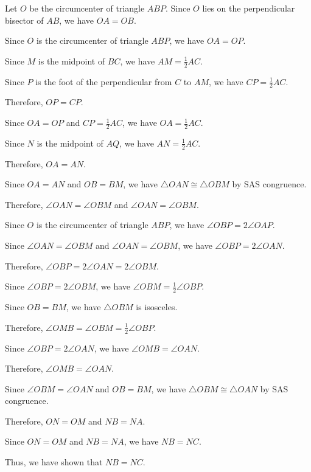 Let $O$ be the circumcenter of triangle $ABP$. Since $O$ lies on the perpendicular bisector of $AB$, we have $OA = OB$. 

Since $O$ is the circumcenter of triangle $ABP$, we have $OA = OP$. 

Since $M$ is the midpoint of $BC$, we have $AM = \frac{1}{2}AC$. 

Since $P$ is the foot of the perpendicular from $C$ to $AM$, we have $CP = \frac{1}{2}AC$. 

Therefore, $OP = CP$. 

Since $OA = OP$ and $CP = \frac{1}{2}AC$, we have $OA = \frac{1}{2}AC$. 

Since $N$ is the midpoint of $AQ$, we have $AN = \frac{1}{2}AC$. 

Therefore, $OA = AN$. 

Since $OA = AN$ and $OB = BM$, we have $\triangle OAN \cong \triangle OBM$ by SAS congruence. 

Therefore, $\angle OAN = \angle OBM$ and $\angle OAN = \angle OBM$. 

Since $O$ is the circumcenter of triangle $ABP$, we have $\angle OBP = 2\angle OAP$. 

Since $\angle OAN = \angle OBM$ and $\angle OAN = \angle OBM$, we have $\angle OBP = 2\angle OAN$. 

Therefore, $\angle OBP = 2\angle OAN = 2\angle OBM$. 

Since $\angle OBP = 2\angle OBM$, we have $\angle OBM = \frac{1}{2}\angle OBP$. 

Since $OB = BM$, we have $\triangle OBM$ is isosceles. 

Therefore, $\angle OMB = \angle OBM = \frac{1}{2}\angle OBP$. 

Since $\angle OBP = 2\angle OAN$, we have $\angle OMB = \angle OAN$. 

Therefore, $\angle OMB = \angle OAN$. 

Since $\angle OBM = \angle OAN$ and $OB = BM$, we have $\triangle OBM \cong \triangle OAN$ by SAS congruence. 

Therefore, $ON = OM$ and $NB = NA$. 

Since $ON = OM$ and $NB = NA$, we have $NB = NC$. 

Thus, we have shown that $NB = NC$.
